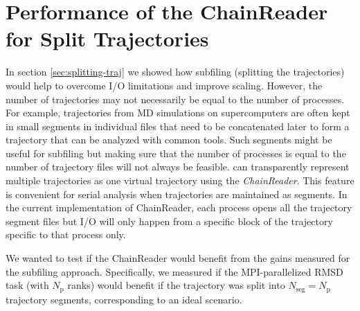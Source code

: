 
\section{Performance of the ChainReader for Split Trajectories}
\label{sec:chainreader}

In section \ref{sec:splitting-traj} we showed how subfiling (splitting the trajectories) would help to overcome I/O limitations and improve scaling. 
However, the number of trajectories may not necessarily be equal to the number of processes.
For example, trajectories from MD simulations on supercomputers are often kept in small segments in individual files that need to be concatenated later to form a trajectory that can be analyzed with common tools.
Such segments might be useful for subfiling but making sure that the number of processes is equal to the number of trajectory files will not always be feasible. 
 can transparently represent multiple trajectories as one virtual trajectory using the \emph{ChainReader}.
This feature is  convenient for serial analysis when trajectories are maintained as segments.
In the current implementation of ChainReader, each process opens all the trajectory segment files but I/O will only happen from a specific block of the trajectory specific to that process only.

We wanted to test if the ChainReader would benefit from the gains measured for the subfiling approach.
Specifically, we measured if the MPI-parallelized RMSD task (with $N_{\text{p}}$ ranks) would benefit if the trajectory was split into $N_{\text{seg}} = N_{\text{p}}$ trajectory segments, corresponding to an ideal scenario.
 
